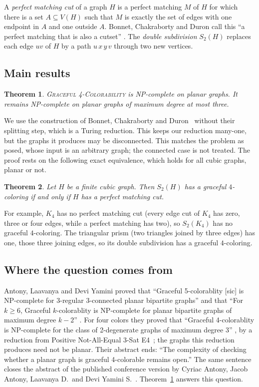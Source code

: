 \documentclass[11pt]{article}
\newcommand{\GFC}{\textup{\textsc{Graceful 4-Colorability}}}
\newtheorem{theorem}{Theorem}
\theoremstyle{remark}
\begin{document}
A \emph{perfect matching cut} of a graph $H$ is a perfect matching $M$ of $H$
for which there is a set $A\subseteq V(H)$ such that $M$ is exactly the set
of edges with one endpoint in $A$ and one outside $A$. Bonnet, Chakraborty
and Duron call this ``a perfect matching that is also a cutset''
\cite[Section~2]{BCD}. The \emph{double subdivision} $S_2(H)$ replaces each
edge $uv$ of $H$ by a path $u\,x\,y\,v$ through two new vertices.

\subsection{Main results}

\begin{theorem}\label{thm:main}
\GFC{} is NP-complete on planar graphs. It remains
NP-complete on planar graphs of maximum degree at most three.
\end{theorem}

We use the construction of Bonnet, Chakraborty and Duron~\cite{BCD} without
their splitting step, which is a Turing reduction. This keeps our reduction
many-one, but the graphs it produces may be disconnected. This matches the
problem as posed, whose input is an arbitrary graph; the connected case is not
treated. The proof rests on the following exact equivalence, which holds for
all cubic graphs, planar or not.

\begin{theorem}\label{thm:equiv}
Let $H$ be a finite cubic graph. Then $S_2(H)$
has a graceful $4$-coloring if and only if $H$ has a perfect matching cut.
\end{theorem}

For example, $K_4$ has no perfect matching cut (every edge cut of $K_4$ has
zero, three or four edges, while a perfect matching has two), so $S_2(K_4)$
has no graceful $4$-coloring. The triangular prism (two triangles joined by
three edges) has one, those three joining edges, so its double subdivision has
a graceful $4$-coloring.

\subsection{Where the question comes from}

Antony, Laavanya and Devi Yamini proved that ``Graceful 5-colorablity [sic] is
NP-complete for 3-regular 3-connected planar bipartite graphs'' and that
``For $k\ge 6$, Graceful $k$-colorablity is NP-complete for planar bipartite
graphs of maximum degree $k-2$'' \cite[Theorems~4 and~5]{ALD}. For four
colors they proved that ``Graceful 4-colorablity is NP-complete for the class
of 2-degenerate graphs of maximum degree 3'' \cite[Theorem~6]{ALD}, by a
reduction from Positive Not-All-Equal 3-Sat E4~\cite{DD}; the graphs this
reduction produces need not be planar. Their
abstract ends: ``The complexity of checking whether a planar graph is graceful
4-colorable remains open.'' The same sentence closes the abstract of the
published conference version by Cyriac Antony, Jacob Antony, Laavanya D.\ and
Devi Yamini S.~\cite{AALD}. Theorem~\ref{thm:main} answers this question.
\end{document}
